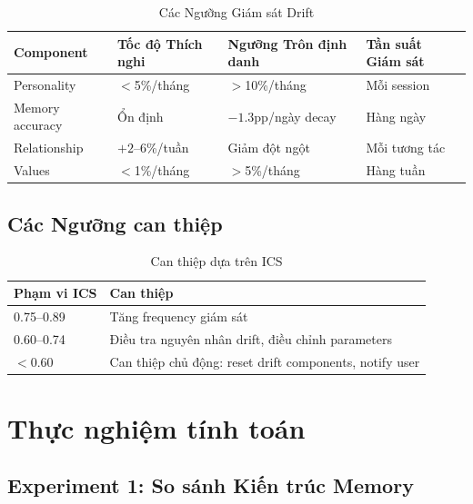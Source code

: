 \documentclass[10pt,leqno]{amsart}
\begin{document}
\begin{table}[H]
\centering
\caption{Các Ngưỡng Giám sát Drift}
\label{tab:drift-thresholds}
\begin{tabular}{llll}
\toprule
\textbf{Component} & \textbf{Tốc độ Thích nghi} & \textbf{Ngưỡng Trôn định danh} & \textbf{Tần suất Giám sát} \\
\midrule
Personality & $<$5\%/tháng & $>$10\%/tháng & Mỗi session \\
Memory accuracy & Ổn định & $-1.3$pp/ngày decay & Hàng ngày \\
Relationship & $+2$--$6$\%/tuần & Giảm đột ngột & Mỗi tương tác \\
Values & $<$1\%/tháng & $>$5\%/tháng & Hàng tuần \\
\bottomrule
\end{tabular}
\end{table}

\subsection{Các Ngưỡng can thiệp}

\begin{table}[H]
\centering
\caption{Can thiệp dựa trên ICS}
\label{tab:ics-intervention}
\begin{tabular}{ll}
\toprule
\textbf{Phạm vi ICS} & \textbf{Can thiệp} \\
\midrule
0.75--0.89 & Tăng frequency giám sát \\
0.60--0.74 & Điều tra nguyên nhân drift, điều chỉnh parameters \\
$<$0.60 & Can thiệp chủ động: reset drift components, notify user \\
\bottomrule
\end{tabular}
\end{table}


\section{Thực nghiệm tính toán}

\subsection{Experiment 1: So sánh Kiến trúc Memory}
\end{document}
